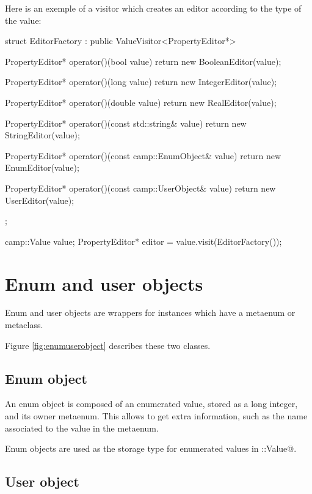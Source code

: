 \documentclass[a4paper, twoside]{report}
\begin{document}
	Here is an exemple of a visitor which creates an editor according to the type of the value:

\begin{minipage}{\linewidth}
\begin{cppcode}
struct EditorFactory : public ValueVisitor<PropertyEditor*>
{
    PropertyEditor* operator()(bool value)
    {
        return new BooleanEditor(value);
    }

    PropertyEditor* operator()(long value)
    {
        return new IntegerEditor(value);
    }

    PropertyEditor* operator()(double value)
    {
        return new RealEditor(value);
    }

    PropertyEditor* operator()(const std::string& value)
    {
        return new StringEditor(value);
    }

    PropertyEditor* operator()(const camp::EnumObject& value)
    {
        return new EnumEditor(value);
    }

    PropertyEditor* operator()(const camp::UserObject& value)
    {
        return new UserEditor(value);
    }
};

camp::Value value;
PropertyEditor* editor = value.visit(EditorFactory());
\end{cppcode}
\end{minipage}

\chapter{Enum and user objects}

	Enum and user objects are wrappers for instances which have a metaenum or metaclass.
	
	Figure \ref{fig:enumuserobject} describes these two classes.

\section{Enum object}

  An enum object is composed of an enumerated value, stored as a long integer, and its owner metaenum. This allows to get extra information,
  such as the name associated to the value in the metaenum.
  
  Enum objects are used as the storage type for enumerated values in \verb@camp::Value@.

\section{User object}
\end{document}
